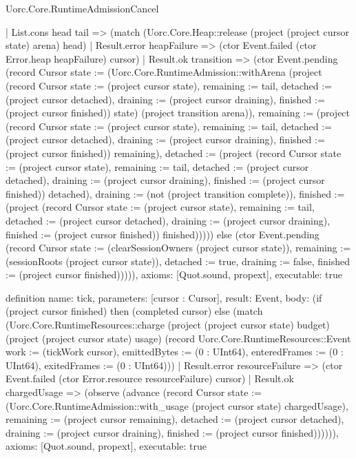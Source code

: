 \begin{lexlean}{Uorc.Core.RuntimeAdmissionCancel}
\begin{semanticmodule}
{    | List.cons head tail => (match (Uorc.Core.Heap::release (project (project cursor state) arena) head)
      | Result.error heapFailure => (ctor Event.failed (ctor Error.heap heapFailure) cursor)
      | Result.ok transition => (ctor Event.pending (record Cursor {state := (Uorc.Core.RuntimeAdmission::withArena (project (record Cursor {state := (project cursor state), remaining := tail, detached := (project cursor detached), draining := (project cursor draining), finished := (project cursor finished)}) state) (project transition arena)), remaining := (project (record Cursor {state := (project cursor state), remaining := tail, detached := (project cursor detached), draining := (project cursor draining), finished := (project cursor finished)}) remaining), detached := (project (record Cursor {state := (project cursor state), remaining := tail, detached := (project cursor detached), draining := (project cursor draining), finished := (project cursor finished)}) detached), draining := (not (project transition complete)), finished := (project (record Cursor {state := (project cursor state), remaining := tail, detached := (project cursor detached), draining := (project cursor draining), finished := (project cursor finished)}) finished)})))) else (ctor Event.pending (record Cursor {state := (clearSessionOwners (project cursor state)), remaining := (sessionRoots (project cursor state)), detached := true, draining := false, finished := (project cursor finished)})))),
  axioms: [Quot.sound, propext],
  executable: true
}

definition{
  name: tick,
  parameters: [cursor : Cursor],
  result: Event,
  body: (if (project cursor finished) then (completed cursor) else (match (Uorc.Core.RuntimeResources::charge (project (project cursor state) budget) (project (project cursor state) usage) (record Uorc.Core.RuntimeResources::Event {work := (tickWork cursor), emittedBytes := (0 : UInt64), enteredFrames := (0 : UInt64), exitedFrames := (0 : UInt64)}))
    | Result.error resourceFailure => (ctor Event.failed (ctor Error.resource resourceFailure) cursor)
    | Result.ok chargedUsage => (observe (advance (record Cursor {state := (Uorc.Core.RuntimeAdmission::with_usage (project cursor state) chargedUsage), remaining := (project cursor remaining), detached := (project cursor detached), draining := (project cursor draining), finished := (project cursor finished)}))))),
  axioms: [Quot.sound, propext],
  executable: true
}
\end{semanticmodule}
\end{lexlean}
